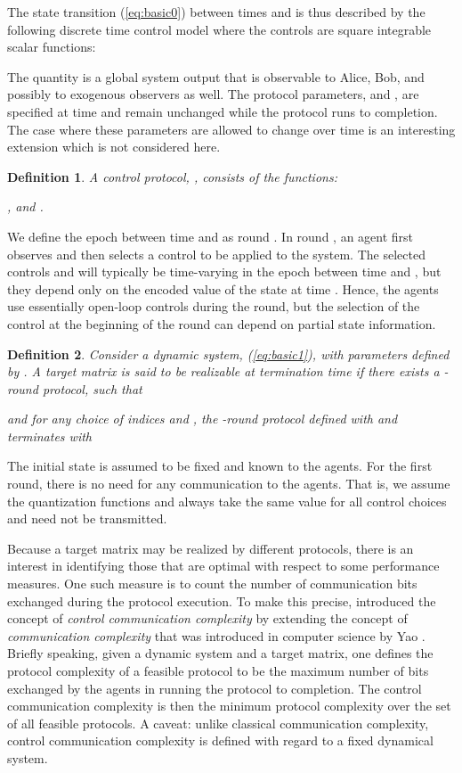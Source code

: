 \documentclass[12pt,onecolumn,draftcls]{IEEEtran}
\newtheorem{definition}{Definition}[section]
\begin{document}
The state transition (\ref{eq:basic0}) between times  and  is thus described by the following discrete time control model
where the controls are square integrable scalar functions:


The quantity  is a global system output that is observable to Alice, Bob, and possibly to
exogenous observers as well.  The protocol parameters,  and , are specified
at time  and remain unchanged while the protocol runs to completion.  The case where these parameters are
allowed to change over time is an interesting extension which is not considered here.

\begin{definition}
A control protocol, , consists of the functions:

, and .
\end{definition}

We define the epoch between time  and  as round .
In round , an agent first observes and then selects a control to be applied to the
system.  The selected controls  and 
 will typically be time-varying in the epoch between time  and , but they depend only on the encoded value of the state at time .  Hence, the agents use essentially open-loop controls during the round, but the selection of
the control at the beginning of the round can depend on partial state information.  

\begin{definition}
Consider a dynamic system, (\ref{eq:basic1}), with parameters defined  by .
A target matrix  is said to be realizable at termination time 
if there exists a -round protocol, such that

and for any choice of indices  and , the -round protocol defined with
 and   terminates with

\end{definition} 

The initial state is assumed to be fixed and known to the agents.
For the first round, there is no need for any communication to the agents.  That is, we assume the
quantization functions  and  always take the same value for all control choices
and need not be transmitted.

Because a target matrix may be realized by different protocols, there is an interest in identifying those that are optimal
with respect to some performance measures.  One such measure
is to count the number of communication bits exchanged during the protocol execution.
To make this precise, \cite{Wong} introduced the concept of  {\it control communication complexity} by extending the concept of  {\em communication complexity} that was introduced in computer science by Yao
\cite{yao1}.  Briefly speaking, given a dynamic system and a target matrix, one defines the protocol complexity of a feasible protocol to be the maximum number of bits exchanged by the agents in running the protocol to completion.   The control communication complexity is then the minimum protocol complexity over the set of all feasible protocols.  A caveat: unlike classical communication complexity, control communication complexity is defined with regard to a fixed dynamical system. 
\end{document}
